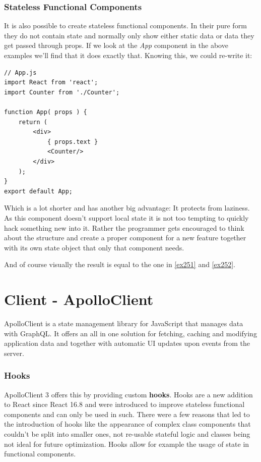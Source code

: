 \subsubsection{Stateless Functional Components}
It is also possible to create stateless functional components. In their pure form they do not contain state and normally only show either static data or data they get passed through props. If we look at the \emph{App} component in the above examples we'll find that it does exactly that. Knowing this, we could re-write it:
\begin{lstlisting}[caption={App as Functional Component}]
// App.js
import React from 'react';
import Counter from './Counter';

function App( props ) {
	return (
		<div>
			{ props.text }
			<Counter/>
		</div>
	);
}
export default App;
\end{lstlisting}
Which is a lot shorter and has another big advantage: It protects from laziness. \cite{CoryHouse} As this component doesn't support local state it is not too tempting to quickly hack something new into it. Rather the programmer gets encouraged to think about the structure and create a proper component for a new feature together with its own state object that only that component needs.

And of course visually the result is equal to the one in \autoref{ex251} and \autoref{ex252}.

\section{Client - ApolloClient}
ApolloClient is a state management library for JavaScript that manages data with GraphQL. It offers an all in one solution for fetching, caching and modifying application data and together with automatic UI updates upon events from the server. \cite{ApolloClientIntro}

\subsubsection{Hooks}
ApolloClient 3 offers this by providing custom \textbf{hooks}. Hooks are a new addition to React since React 16.8 and were introduced to improve stateless functional components \cite{ReactHooksIntro} and can only be used in such. \cite{ReactHooksOverview} There were a few reasons that led to the introduction of hooks like the appearance of complex class components that couldn't be split into smaller ones, not re-usable stateful logic and classes being not ideal for future optimization. \cite{ReactHooksIntro} Hooks allow for example the usage of state in functional components.

